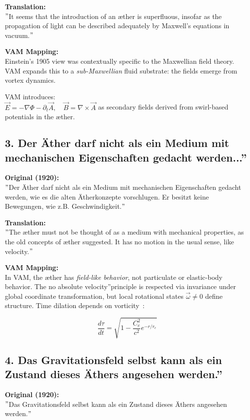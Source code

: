 \documentclass[preprint]{revtex4-2}
\begin{document}
    \textbf{Translation:} \\
    \("\)It seems that the introduction of an æther is superfluous, insofar as the propagation of light can be described adequately by Maxwell's equations in vacuum.\("\)

    \textbf{VAM Mapping:} \\
    Einstein's 1905 view was contextually specific to the Maxwellian field theory. VAM expands this to a \emph{sub-Maxwellian} fluid substrate: the fields emerge from vortex dynamics.

    VAM introduces: \\
    \( \vec{E} = -\nabla \Phi - \partial_t \vec{A}, \quad \vec{B} = \nabla \times \vec{A} \) as secondary fields derived from swirl-based potentials in the æther.

    \subsection*{3. \grqq Der Äther darf nicht als ein Medium mit mechanischen Eigenschaften gedacht werden...\textquotedblright}
    \textbf{Original (1920):} \\
    \("\)Der Äther darf nicht als ein Medium mit mechanischen Eigenschaften gedacht werden, wie es die alten Ätherkonzepte vorschlugen. Er besitzt keine Bewegungen, wie z.B. Geschwindigkeit.\("\)

    \textbf{Translation:} \\
    \("\)The æther must not be thought of as a medium with mechanical properties, as the old concepts of æther suggested. It has no motion in the usual sense, like velocity.\("\)

    \textbf{VAM Mapping:} \\
    In VAM, the æther has \emph{field-like behavior}, not particulate or elastic-body behavior. The \grqq no absolute velocity\textquotedblright principle is respected via invariance under global coordinate transformation, but local rotational states \( \vec{\omega} \neq 0 \) define structure. Time dilation depends on vorticity~\cite{iskandarani2025vam2}:

    \[
    \frac{d\tau}{dt} = \sqrt{1 - \frac{C_e^2}{c^2} e^{-r/r_c}}
    \]

    \subsection*{4. \grqq Das Gravitationsfeld selbst kann als ein Zustand dieses Äthers angesehen werden.\textquotedblright}
    \textbf{Original (1920):} \\
    \("\)Das Gravitationsfeld selbst kann als ein Zustand dieses Äthers angesehen werden.\("\)
\end{document}
